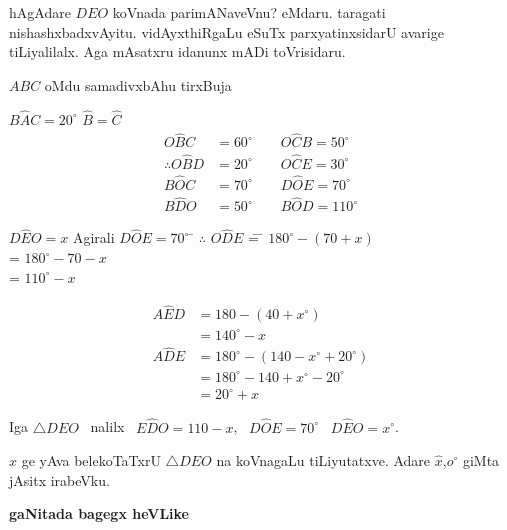 hAgAdare $DEO$ koVnada parimANaveVnu? eMdaru. taragati nishashxbadxvAyitu. vidAyxthiRgaLu eSuTx parxyatinxsidarU avarige tiLiyalilalx. Aga mAsatxru idanunx mADi toVrisidaru.

$ABC$ \quad oMdu samadivxbAhu tirxBuja

$B\widehat{A}C=20^\circ$ \qquad $\widehat{B}=\widehat{C}$
\begin{align*}
O\widehat{B}C &=60^\circ  \qquad O\widehat{C}B =50^\circ\\
\therefore O\widehat{B}D  &=20^\circ  \qquad O\widehat{C}E =30^\circ\\
B\widehat{O}C &=70^\circ   \qquad D\widehat{O}E =70^\circ\\
B\widehat{D}O &=50^\circ   \qquad B\widehat{O}D =110^\circ
\end{align*}

\begin{tabbing}
$D\widehat{E}O=x$  \; \; Agirali \;\; $D\widehat{O}E=70^\circ$ \;\; \= $\therefore$ \;\; $O\widehat{D}E$ \= = \= $180^\circ-(70+x)$\\
\> \> = \> $180^\circ-70-x$\\
\> \> = \> $110^\circ-x$
\end{tabbing}
\begin{align*}
A\widehat{E}D &=180-(40+x^\circ)\\
&=140^\circ-x\\
A\widehat{D}E & =180^\circ-(140-x^\circ+20^\circ)\\
&=180^\circ-140+x^\circ-20^\circ\\
& =20^\circ+x
\end{align*} 

Iga $\bigtriangleup DEO$~ nalilx~ $E\widehat{D}O=110-x$,~ $D\widehat{O}E=70^\circ$~ $D\widehat{E}O=x^\circ$.

$x$ ge yAva belekoTaTxrU $\bigtriangleup DEO$ na koVnagaLu tiLiyutatxve. Adare  $\widehat{x}$,\break $o^\circ$ giMta jAsitx irabeVku.

\begin{center}
{\bf gaNitada bagegx heVLike}
\end{center}

